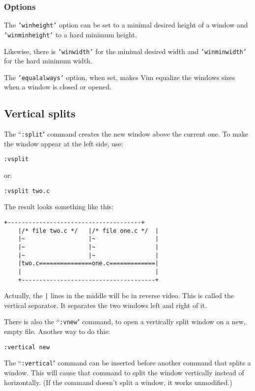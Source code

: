 \subsubsection{Options}
The \texttt{'winheight'} option can be set to a minimal desired height of a window and \texttt{'winminheight'} to a hard minimum height.

Likewise, there is \texttt{'winwidth'} for the minimal desired width and \texttt{'winminwidth'} for the hard minimum width.

The \texttt{'equalalways'} option, when set, makes Vim equalize the windows sizes when a window is closed or opened.

\subsection{Vertical splits}
The ``\texttt{:split}" command creates the new window above the current one.
To make the window appear at the left side, use:

 \begin{Verbatim}[samepage=true]
 :vsplit
 \end{Verbatim}

or:
 \begin{Verbatim}[samepage=true]
 :vsplit two.c
 \end{Verbatim}

The result looks something like this:

\begin{Verbatim}[samepage=true]
    +--------------------------------------+
    |/* file two.c */   |/* file one.c */  |
    |~                  |~                 |
    |~                  |~                 |
    |~                  |~                 |
    |two.c===============one.c=============|
    |                                      |
    +--------------------------------------+
\end{Verbatim}

Actually, the \texttt{|} lines in the middle will be in reverse video.
This is called the vertical separator.
It separates the two windows left and right of it.

There is also the ``\texttt{:vnew}" command, to open a vertically split window on a new, empty file.
Another way to do this:

 \begin{Verbatim}[samepage=true]
 :vertical new
 \end{Verbatim}

The ``\texttt{:vertical}" command can be inserted before another command that splits a window.
This will cause that command to split the window vertically instead of horizontally.
(If the command doesn't split a window, it works unmodified.)

